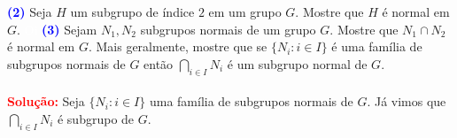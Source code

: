 \documentclass[12pt, a4paper]{article}
\newcommand{\sol}{\textbf{\textcolor{red}{Solução:}} }
\begin{document}
\begin{tasks}[counter-format={(tsk[a])},label-width=3.6ex, label-format = {\bfseries}, column-sep = {0pt}]
\end{tasks}%

\textcolor{blue}{\bf(2)}\label{40} Seja $H$ um subgrupo de índice $2$ em um grupo $G.$ Mostre que $H$ é normal em $G.$ 
\textcolor{white}{Oi}\newline\newline
\textcolor{blue}{\bf(3)}\label{41} Sejam $N_1, N_2$ subgrupos normais de um grupo $G.$ Mostre que $N_1 \cap N_2$ é normal em $G.$ Mais geralmente, mostre que se $\{N_i : i \in I \}$ é uma família de subgrupos normais de $G$ então $\bigcap\limits_{i \in I} N_i$ é um subgrupo normal de $G.$\\ \\
\sol Seja $\{ N_i : i \in I \}$ uma família de subgrupos normais de $G.$ Já vimos que $\bigcap\limits_{i \in I} N_i$ é subgrupo de $G.$
\end{document}
